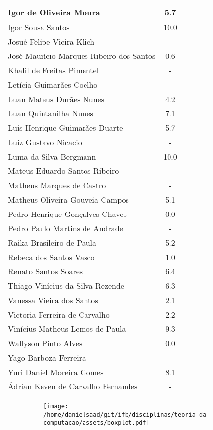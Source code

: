 \documentclass{article}
\begin{document}
\begin{longtable}{|l|c|}
Igor de Oliveira Moura & 5.7\\\hline
Igor Sousa Santos & 10.0\\\hline
Josué Felipe Vieira Klich & -\\\hline
José Maurício Marques Ribeiro dos Santos & 0.6\\\hline
Khalil de Freitas Pimentel & -\\\hline
Letícia Guimarães Coelho & -\\\hline
Luan Mateus Durães Nunes & 4.2\\\hline
Luan Quintanilha Nunes & 7.1\\\hline
Luis Henrique Guimarães Duarte & 5.7\\\hline
Luiz Gustavo Nicacio & -\\\hline
Luma da Silva Bergmann & 10.0\\\hline
Mateus Eduardo Santos Ribeiro & -\\\hline
Matheus Marques de Castro & -\\\hline
Matheus Oliveira Gouveia Campos & 5.1\\\hline
Pedro Henrique Gonçalves Chaves & 0.0\\\hline
Pedro Paulo Martins de Andrade & -\\\hline
Raika Brasileiro de Paula & 5.2\\\hline
Rebeca dos Santos Vasco & 1.0\\\hline
Renato Santos Soares & 6.4\\\hline
Thiago Vinícius da Silva Rezende & 6.3\\\hline
Vanessa Vieira dos Santos & 2.1\\\hline
Victoria Ferreira de Carvalho & 2.2\\\hline
Vinícius Matheus Lemos de Paula & 9.3\\\hline
Wallyson Pinto Alves & 0.0\\\hline
Yago Barboza Ferreira & -\\\hline
Yuri Daniel Moreira Gomes & 8.1\\\hline
Ádrian Keven de Carvalho Fernandes & -\\\hline
\end{longtable}
\begin{figure}[h!]
\centering\begin{subfigure}
        \centering
        \texttt{[image: /home/danielsaad/git/ifb/disciplinas/teoria-da-computacao/assets/boxplot.pdf]}
    \end{subfigure}\end{figure}
\end{document}

